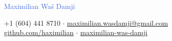 \documentclass[11pt]{article}
\newcommand{\headinginline}[2]{
    \begin{minipage}[t]{0.55\textwidth}
    \vspace*{\fill}
    #1
    \end{minipage}
    \begin{minipage}[t]{0.45\textwidth}
    \begin{flushright}
    \vspace*{\fill}
    \vspace{8px}
    #2
    \end{flushright}
    \end{minipage}
}
\newcommand{\github}[1]{\href{https://github.com/#1/}{github.com/#1}}
\newcommand{\email}[1]{\href{mailto:#1}{#1}}
\newcommand{\linkedin}[1]{\href{https://www.linkedin.com/in/#1/}{#1}}
\begin{document}

\begin{center}
    {
        \Huge
        \textcolor{RoyalBlue}{Maximilian Waś Damji} \\
    }

    \faPhone{}
    +1 (604) 441 8710 $\cdot$
    \faEnvelope{}
    \email{maximilian.wasdamji@gmail.com}\\
    \faGithub{}
    \github{haximilian} $\cdot$
    \faLinkedin{}
    \linkedin{maximilian-was-damji}
\end{center}






\end{document}
